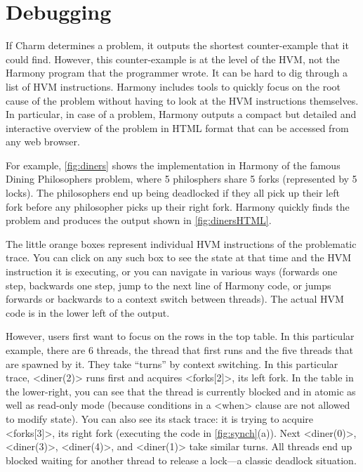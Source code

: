\documentclass[twocolumn]{article}
\begin{document}
\section{Debugging}

If Charm determines a problem, it outputs the shortest counter-example that
it could find.  However, this counter-example is at the level of the HVM,
not the Harmony program that the programmer wrote.  It can be hard to
dig through a list of HVM instructions.
Harmony includes tools to quickly focus on the root cause of the
problem without having to look at the HVM instructions themselves.
In particular, in case of a problem, Harmony outputs a compact
but detailed and interactive overview of the problem in HTML format that
can be accessed from any web browser.

For example, \autoref{fig:diners} shows the implementation
in Harmony of the famous Dining Philosophers problem, where 5 philosphers
share 5 forks (represented by 5 locks).
The philosophers end up being deadlocked
if they all pick up their left fork before any philosopher picks up
their right fork.
Harmony quickly finds the problem and produces the output
shown in \autoref{fig:dinersHTML}.

The little orange boxes represent individual HVM instructions of the
problematic trace.  You can click on any such box to see the state
at that time and the HVM instruction it is executing,
or you can navigate in various ways (forwards one step,
backwards one step, jump to the next line of Harmony code, or jumps
forwards or backwards to a context switch between threads).  The actual
HVM code is in the lower left of the output.

However, users first want to focus on the rows in the top table.
In this particular example, there are 6 threads, the thread that
first runs and the five threads that are spawned by it.  They take
``turns'' by context switching.  In this particular trace, <{diner(2)}>
runs first and acquires <{forks[2]}>, its left fork.  In the table
in the lower-right, you can see that the thread is currently blocked
and in atomic as well as read-only mode (because conditions in a <{when}>
clause are not allowed to modify state).  You can also see its stack
trace: it is trying to acquire <{forks[3]}>, its right fork (executing
the code in \autoref{fig:synch}(a)).  Next <{diner(0)}>, <{diner(3)}>,
<{diner(4)}>, and <{diner(1)}> take similar turns.  All threads end up
blocked waiting for another thread to release a lock---a classic
deadlock situation.
\end{document}
